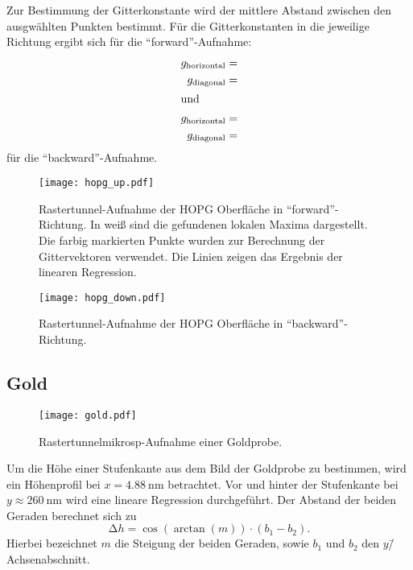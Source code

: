 Zur Bestimmung der Gitterkonstante wird der mittlere Abstand zwischen den ausgwählten Punkten bestimmt.
Für die Gitterkonstanten in die jeweilige Richtung ergibt sich für die \enquote{forward}-Aufnahme:
\begin{align}
  g_\text{horizontal} &=  \\
  g_\text{diagonal} &=  \\
\shortintertext{und}
  g_\text{horizontal} &=  \\
  g_\text{diagonal} &= 
\end{align}
für die \enquote{backward}-Aufnahme.

\begin{figure}
  \centering
  \texttt{[image: hopg\_up.pdf]}
  \caption{%
    Rastertunnel-Aufnahme der HOPG Oberfläche in \enquote{forward}-Richtung.
    In weiß sind die gefundenen lokalen Maxima dargestellt. Die farbig markierten Punkte wurden zur Berechnung der Gittervektoren verwendet.
    Die Linien zeigen das Ergebnis der linearen Regression.
  }\label{fig:hopg_up}
\end{figure}

\begin{figure}
  \centering
  \texttt{[image: hopg\_down.pdf]}
  \caption{%
    Rastertunnel-Aufnahme der HOPG Oberfläche in \enquote{backward}-Richtung.
  }\label{fig:hopg_down}
\end{figure}

\subsection{Gold}

\begin{figure}
  \centering
  \texttt{[image: gold.pdf]}
  \caption{Rastertunnelmikrosp-Aufnahme einer Goldprobe.}
  \label{fig:gold}
\end{figure}

Um die Höhe einer Stufenkante aus dem Bild der Goldprobe zu bestimmen, wird ein Höhenprofil bei $x=\SI{4.88}{\nano\meter}$ betrachtet.
Vor und hinter der Stufenkante bei  $y \approx \SI{260}{\nano\meter}$ wird eine lineare Regression durchgeführt.
Der Abstand der beiden Geraden berechnet sich zu
\begin{equation}
  \increment h = \cos(\arctan(m)) \cdot (b_1 - b_2).
\end{equation}
Hierbei bezeichnet $m$ die Steigung der beiden Geraden, sowie $b_1$ und $b_2$ den $y$\=/Achsenabschnitt.


